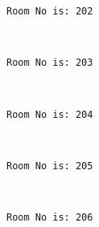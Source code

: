 \documentclass[11pt]{article}
\begin{document}
    \begin{Verbatim}[commandchars=\\\{\}]
Room No is: 202

    \end{Verbatim}

    \begin{center}
    \end{center}
    { \hspace*{\fill} \\}
    
    \begin{Verbatim}[commandchars=\\\{\}]
Room No is: 203

    \end{Verbatim}

    \begin{center}
    \end{center}
    { \hspace*{\fill} \\}
    
    \begin{Verbatim}[commandchars=\\\{\}]
Room No is: 204

    \end{Verbatim}

    \begin{center}
    \end{center}
    { \hspace*{\fill} \\}
    
    \begin{Verbatim}[commandchars=\\\{\}]
Room No is: 205

    \end{Verbatim}

    \begin{center}
    \end{center}
    { \hspace*{\fill} \\}
    
    \begin{Verbatim}[commandchars=\\\{\}]
Room No is: 206

    \end{Verbatim}
\end{document}
